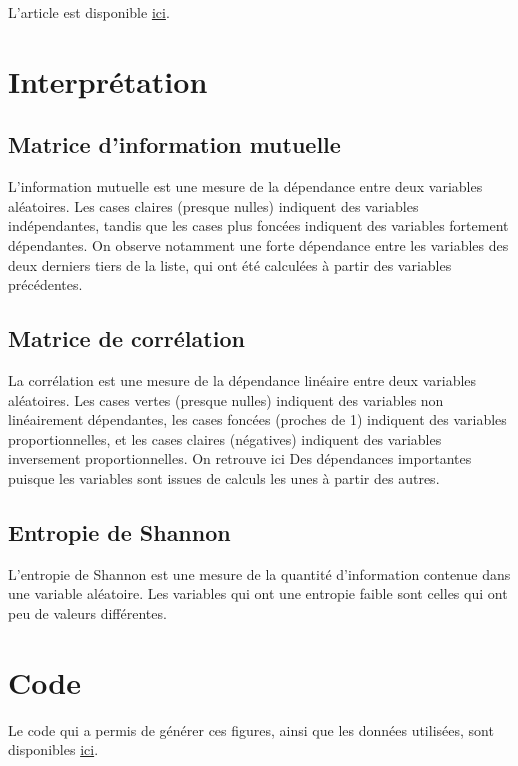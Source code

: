 \documentclass{article}
\begin{document}
L'article est disponible \href{https://hal.science/hal-04234874/}{ici}.

\section{Interprétation}

\subsection{Matrice d'information mutuelle}

L'information mutuelle est une mesure de la dépendance entre deux variables aléatoires.
Les cases claires (presque nulles) indiquent des variables indépendantes, tandis que les cases plus foncées indiquent des variables fortement dépendantes.
On observe notamment une forte dépendance entre les variables des deux derniers tiers de la liste, qui ont été calculées à partir des variables précédentes.

\subsection{Matrice de corrélation}

La corrélation est une mesure de la dépendance linéaire entre deux variables aléatoires.
Les cases vertes (presque nulles) indiquent des variables non linéairement dépendantes, les cases foncées (proches de 1) indiquent des variables proportionnelles, et les cases claires (négatives) indiquent des variables inversement proportionnelles.
On retrouve ici Des dépendances importantes puisque les variables sont issues de calculs les unes à partir des autres.

\subsection{Entropie de Shannon}

L'entropie de Shannon est une mesure de la quantité d'information contenue dans une variable aléatoire.
Les variables qui ont une entropie faible sont celles qui ont peu de valeurs différentes.

\section{Code}

Le code qui a permis de générer ces figures, ainsi que les données utilisées, sont disponibles \href{https://github.com/MartinRB45534/Analyse-variables-pour-20231220}{ici}.
\end{document}
